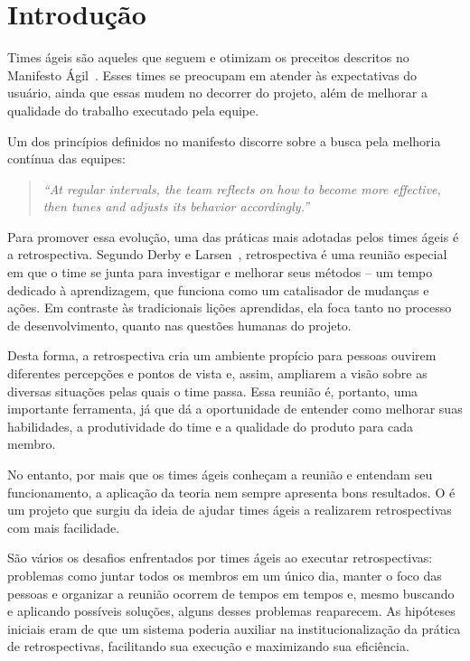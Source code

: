 \section{Introdução}
Times ágeis são aqueles que seguem e otimizam os preceitos descritos no Manifesto Ágil~\cite{manifesto}. Esses times se preocupam em atender às expectativas do usuário, ainda que essas mudem no decorrer do projeto, além de melhorar a qualidade do trabalho executado pela equipe.

Um dos princípios definidos no manifesto discorre sobre a busca pela melhoria contínua das equipes:

\begin{quote}
	\textit{``At regular intervals, the team reflects on how to become more effective, then tunes and adjusts its behavior accordingly.''}~\cite{manifesto}
\end{quote}

Para promover essa evolução, uma das práticas mais adotadas pelos times ágeis é a retrospectiva. Segundo Derby e Larsen~\cite{retrospectives}, retrospectiva é uma reunião especial em que o time se junta para investigar e melhorar seus métodos -- um tempo dedicado à aprendizagem, que funciona como um catalisador de mudanças e ações. Em contraste às tradicionais lições aprendidas, ela foca tanto no processo de desenvolvimento, quanto nas questões humanas do projeto.

Desta forma, a retrospectiva cria um ambiente propício para pessoas ouvirem diferentes percepções e pontos de vista e, assim, ampliarem a visão sobre as diversas situações pelas quais o time passa. Essa reunião é, portanto, uma importante ferramenta, já que dá a oportunidade de entender como melhorar suas habilidades, a produtividade do time e a qualidade do produto para cada membro.

No entanto, por mais que os times ágeis conheçam a reunião e entendam seu funcionamento, a aplicação da teoria nem sempre apresenta bons resultados. O \suricato{} é um projeto que surgiu da ideia de ajudar times ágeis a realizarem retrospectivas com mais facilidade.

São vários os desafios enfrentados por times ágeis ao executar retrospectivas: problemas como juntar todos os membros em um único dia, manter o foco das pessoas e organizar a reunião ocorrem de tempos em tempos e, mesmo buscando e aplicando possíveis soluções, alguns desses problemas reaparecem. As hipóteses iniciais eram de que um sistema poderia auxiliar na institucionalização da prática de retrospectivas, facilitando sua execução e maximizando sua eficiência.

